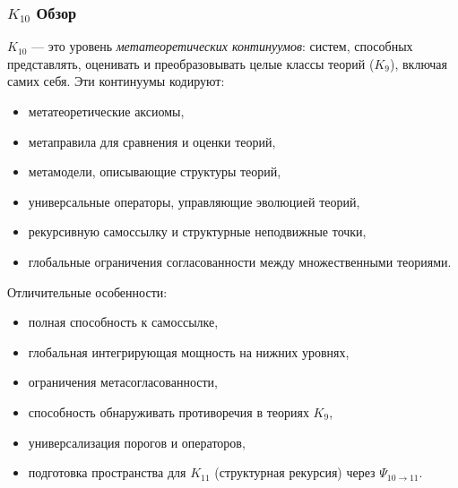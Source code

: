 

\subsubsection{$K_{10}$ Обзор}
\label{sec:k10-overview}

$K_{10}$ — это уровень \emph{метатеоретических континуумов}: систем, способных
представлять, оценивать и преобразовывать целые классы теорий ($K_9$),
включая самих себя. Эти континуумы кодируют:
\begin{itemize}
    \item метатеоретические аксиомы,
    \item метаправила для сравнения и оценки теорий,
    \item метамодели, описывающие структуры теорий,
    \item универсальные операторы, управляющие эволюцией теорий,
    \item рекурсивную самоссылку и структурные неподвижные точки,
    \item глобальные ограничения согласованности между множественными теориями.
\end{itemize}

Отличительные особенности:
\begin{itemize}
    \item полная способность к самоссылке,
    \item глобальная интегрирующая мощность на нижних уровнях,
    \item ограничения метасогласованности,
    \item способность обнаруживать противоречия в теориях $K_9$,
    \item универсализация порогов и операторов,
    \item подготовка пространства для $K_{11}$ (структурная рекурсия) через $\Psi_{10\to11}$.
\end{itemize}

